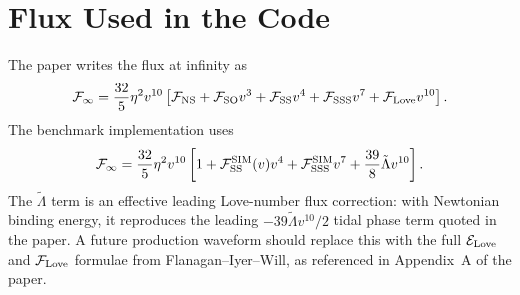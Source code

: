 \documentclass[11pt]{article}
\begin{document}
\section{Flux Used in the Code}

The paper writes the flux at infinity as
\begin{equation}
  {\cal F}_\infty
  =
  \frac{32}{5}\eta^2v^{10}
  \left[
    {\cal F}_{\rm NS}
    +{\cal F}_{\rm SO}v^3
    +{\cal F}_{\rm SS}v^4
    +{\cal F}_{\rm SSS}v^7
    +{\cal F}_{\rm Love}v^{10}
  \right].
\end{equation}
The benchmark implementation uses
\begin{equation}
  {\cal F}_\infty
  =
  \frac{32}{5}\eta^2v^{10}
  \left[
    1
    +{\cal F}_{\rm SS}^{\rm SIM}(v)v^4
    +{\cal F}_{\rm SSS}^{\rm SIM}v^7
    +\frac{39}{8}\tilde\Lambda v^{10}
  \right].
  \label{eq:flux-code}
\end{equation}
The \(\tilde\Lambda\) term is an effective leading Love-number flux correction:
with Newtonian binding energy, it reproduces the leading
\(-39\tilde\Lambda v^{10}/2\) tidal phase term quoted in the paper.  A future
production waveform should replace this with the full
\({\cal E}_{\rm Love}\) and \({\cal F}_{\rm Love}\) formulae from
Flanagan--Iyer--Will, as referenced in Appendix~A of the paper.
\end{document}
